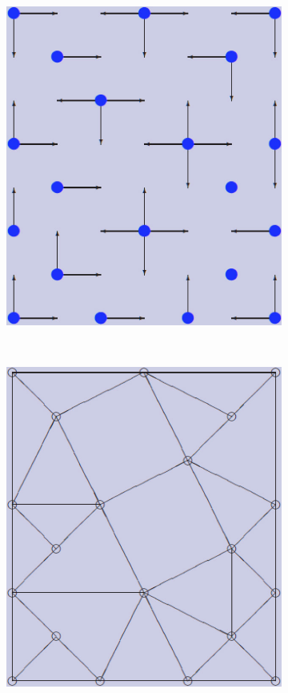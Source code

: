 \documentclass[12pt]{article}
\begin{document}
\begin{figure}[tb]
\begin{subfigure}[b]{0.2\textwidth}
      \caption{}\label{fig:contract_kernel2}
  \end{subfigure}
  ~
  \begin{subfigure}[b]{0.2\textwidth}
      \includegraphics[width=\textwidth]{img/contract_kernel4}
      \caption{}\label{fig:contract_kernel3}
  \end{subfigure}
  ~
  \begin{subfigure}[b]{0.2\textwidth}
      \includegraphics[width=\textwidth]{img/contract_kernel5}

\end{subfigure}
\end{figure}
\end{document}
